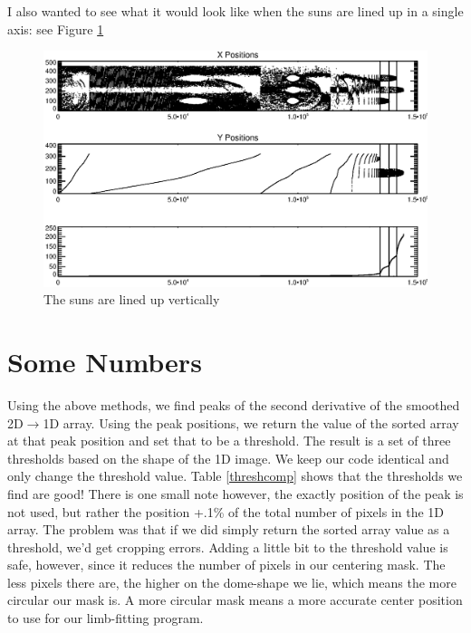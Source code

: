 \documentclass[10pt]{scrartcl}
\begin{document}
I also wanted to see what it would look like when the suns are lined up in a single axis: see Figure \ref{inaline}

\begin{figure}[!ht]
    \centering
    \includegraphics[width=.9\textwidth]{../plots_tables_images/inaline.eps}
    \caption{The suns are lined up vertically}
    \label{inaline}
\end{figure}


\section{Some Numbers} %
\label{sec:some_numbers}
Using the above methods, we find peaks of the second derivative of the smoothed 2D$\rightarrow$1D array. Using the peak positions, we return the value of the sorted array at that peak position and set that to be a threshold. The result is a set of three thresholds based on the shape of the 1D image. We keep our code identical and only change the threshold value. Table \ref{threshcomp} shows that the thresholds we find are good! There is one small note however, the exactly position of the peak is not used, but rather the position +.1\% of the total number of pixels in the 1D array. The problem was that if we did simply return the sorted array value as a threshold, we'd get cropping errors. Adding a little bit to the threshold value is safe, however, since it reduces the number of pixels in our centering mask. The less pixels there are, the higher on the dome-shape we lie, which means the more circular our mask is. A more circular mask means a more accurate center position to use for our limb-fitting program. 
\end{document}
